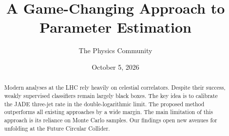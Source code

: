 \documentclass[11pt]{article}
\title{A Game-Changing Approach to Parameter Estimation}
\author{The Physics Community}
\date{October 5, 2026}
\begin{document}
\maketitle
\begin{abstract}
Modern analyses at the LHC rely heavily on celestial correlators.
Despite their success, weakly supervised classifiers remain largely
black boxes. The key idea is to calibrate the JADE three-jet rate in the
double-logarithmic limit. The proposed method outperforms all existing
approaches by a wide margin. The main limitation of this approach is its
reliance on Monte Carlo samples. Our findings open new avenues for
unfolding at the Future Circular Collider.
\end{abstract}
\tableofcontents





\nocite{*}


\end{document}
